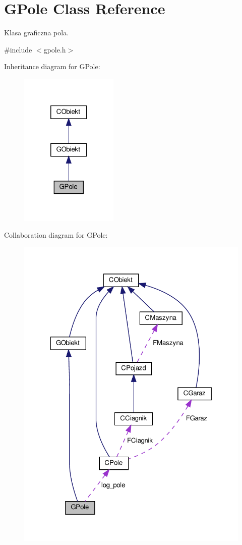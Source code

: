 \hypertarget{class_g_pole}{}\section{G\+Pole Class Reference}
\label{class_g_pole}


Klasa graficzna pola.  




{\ttfamily \#include $<$gpole.\+h$>$}



Inheritance diagram for G\+Pole\+:\nopagebreak
\begin{figure}[H]
\begin{center}
\leavevmode
\includegraphics[width=133pt]{class_g_pole__inherit__graph}
\end{center}
\end{figure}


Collaboration diagram for G\+Pole\+:\nopagebreak
\begin{figure}[H]
\begin{center}
\leavevmode
\includegraphics[width=323pt]{class_g_pole__coll__graph}
\end{center}
\end{figure}
